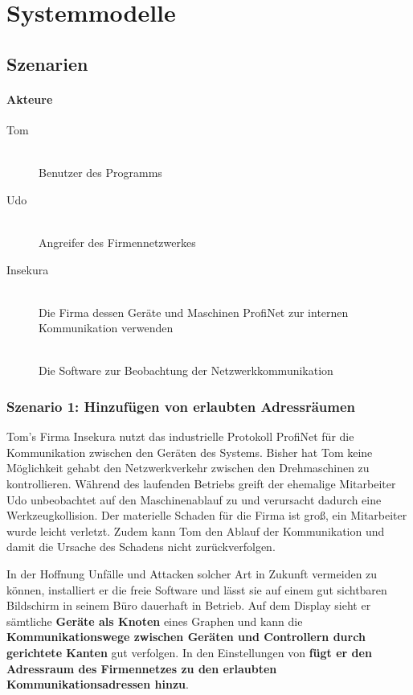 \chapter{Systemmodelle}



\section{Szenarien}

\subsubsection*{Akteure}

\begin{description}

	\item[Tom] \hfill \\
				Benutzer des Programms \programname
	\item[Udo] \hfill \\
				Angreifer des Firmennetzwerkes
	\item[Insekura] \hfill \\
				Die Firma dessen Geräte und Maschinen ProfiNet zur internen Kommunikation verwenden
	\item[\programname]  \hfill \\
				Die Software zur Beobachtung der Netzwerkkommunikation

\end{description}

\subsection{Szenario 1: Hinzufügen von erlaubten Adressräumen}

Tom's Firma Insekura nutzt das industrielle Protokoll ProfiNet für die Kommunikation zwischen den Geräten des Systems. Bisher hat Tom keine Möglichkeit gehabt den Netzwerkverkehr zwischen den Drehmaschinen zu kontrollieren. Während des laufenden Betriebs greift der ehemalige Mitarbeiter Udo unbeobachtet auf den Maschinenablauf zu und verursacht dadurch eine Werkzeugkollision. Der materielle Schaden für die Firma ist groß, ein Mitarbeiter wurde leicht verletzt. Zudem kann Tom den Ablauf der Kommunikation und damit die Ursache des Schadens nicht zurückverfolgen.

In der Hoffnung Unfälle und Attacken solcher Art in Zukunft vermeiden zu können, installiert er die freie Software \programname und lässt sie auf einem gut sichtbaren Bildschirm in seinem Büro dauerhaft in Betrieb. Auf dem Display sieht er sämtliche \textbf{Geräte als Knoten} eines Graphen und kann die \textbf{Kommunikationswege zwischen Geräten und Controllern durch gerichtete Kanten} gut verfolgen. In den Einstellungen von \programname \textbf{fügt er den Adressraum des Firmennetzes zu den erlaubten Kommunikationsadressen hinzu}.

